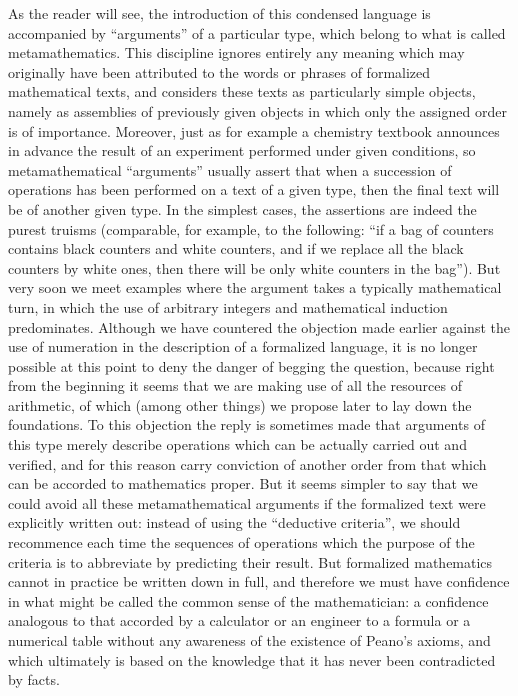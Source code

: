 As the reader will see, the introduction of this condensed language is accompanied by ``arguments'' of a particular type, which belong to what is called metamathematics. This discipline ignores entirely any meaning which may originally have been attributed to the words or phrases of formalized mathematical texts, and considers these texts as particularly simple objects, namely as assemblies of previously given objects in which only the assigned order is of importance. Moreover, just as for example a chemistry textbook announces in advance the result of an experiment performed under given conditions, so metamathematical ``arguments'' usually assert that when a succession of operations has been performed on a text of a given type, then the final text will be of another given type. In the simplest cases, the assertions are indeed the purest truisms (comparable, for example, to the following: ``if a bag of counters contains black counters and white counters, and if we replace all the black counters by white ones, then there will be only white counters in the bag''). But very soon we meet examples where the argument takes a typically mathematical turn, in which the use of arbitrary integers and mathematical induction predominates. Although we have countered the objection made earlier against the use of numeration in the description of a formalized language, it is no longer possible at this point to deny the danger of begging the question, because right from the beginning it seems that we are making use of all the resources of arithmetic, of which (among other things) we propose later to lay down the foundations. To this objection the reply is sometimes made that arguments of this type merely describe operations which can be actually carried out and verified, and for this reason carry conviction of another order from that which can be accorded to mathematics proper. But it seems simpler to say that we could avoid all these metamathematical arguments if the formalized text were explicitly written out: instead of using the ``deductive criteria'', we should recommence each time the sequences of operations which the purpose of the criteria is to abbreviate by predicting their result. But formalized mathematics cannot in practice be written down in full, and therefore we must have confidence in what might be called the common sense of the mathematician: a confidence analogous to that accorded by a calculator or an engineer to a formula or a numerical table without any awareness of the existence of Peano's axioms, and which ultimately is based on the knowledge that it has never been contradicted by facts.


